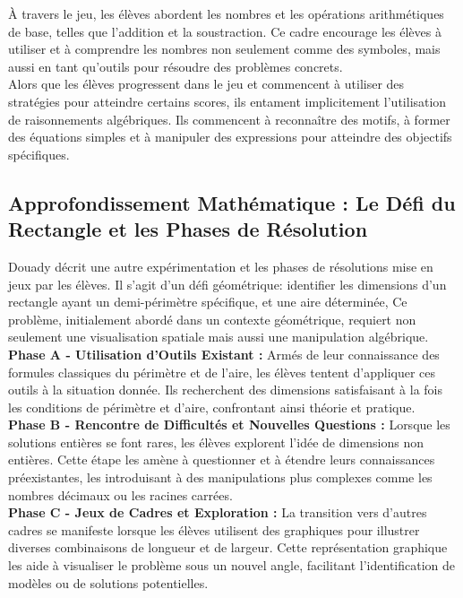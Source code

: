 À travers le jeu,
les élèves abordent les nombres et les opérations arithmétiques de base,
telles que l'addition et la soustraction.
Ce cadre encourage les élèves à utiliser et à comprendre les nombres non seulement comme des symboles,
mais aussi en tant qu'outils pour résoudre des problèmes concrets.\\

Alors que les élèves progressent dans le jeu et commencent à utiliser des stratégies pour atteindre certains scores,
ils entament implicitement l'utilisation de raisonnements algébriques.
Ils commencent à reconnaître des motifs,
à former des équations simples et à manipuler des expressions pour atteindre des objectifs spécifiques.

\subsection{Approfondissement Mathématique : Le Défi du Rectangle et les Phases de Résolution}

Douady décrit une autre expérimentation et les phases de résolutions mise en jeux par les élèves.
Il s'agit d'un défi géométrique:
identifier les dimensions d'un rectangle ayant un demi-périmètre spécifique,
et une aire déterminée,
Ce problème,
initialement abordé dans un contexte géométrique,
requiert non seulement une visualisation spatiale mais aussi une manipulation algébrique.\\

\textbf{Phase A - Utilisation d'Outils Existant :}
Armés de leur connaissance des formules classiques du périmètre et de l'aire,
les élèves tentent d'appliquer ces outils à la situation donnée.
Ils recherchent des dimensions satisfaisant à la fois les conditions de périmètre et d'aire,
confrontant ainsi théorie et pratique.\\

\textbf{Phase B - Rencontre de Difficultés et Nouvelles Questions :}
Lorsque les solutions entières se font rares,
les élèves explorent l'idée de dimensions non entières.
Cette étape les amène à questionner et à étendre leurs connaissances préexistantes,
les introduisant à des manipulations plus complexes comme les nombres décimaux ou les racines carrées.\\

\textbf{Phase C - Jeux de Cadres et Exploration :}
La transition vers d'autres cadres se manifeste lorsque les élèves utilisent des graphiques pour illustrer diverses combinaisons de longueur et de largeur.
Cette représentation graphique les aide à visualiser le problème sous un nouvel angle,
facilitant l'identification de modèles ou de solutions potentielles.\\

